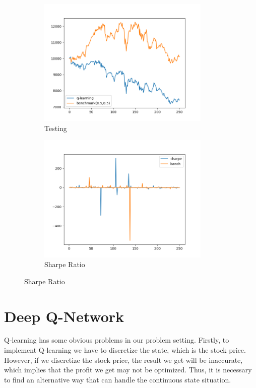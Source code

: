 \begin{figure}[H]
\begin{subfigure}{.5\textwidth}
\includegraphics[clip, width=0.9\textwidth]{Graphics/NEW_TEST_REWARDPV.png} \caption{Testing} 
\end{subfigure}%
\begin{subfigure}{.5\textwidth}%
\centering
\includegraphics[clip, width=0.9\textwidth]{Graphics/REWARDPVS.png} \caption{Sharpe Ratio}
\end{subfigure}%
\end{figure}

\section{Deep Q-Network}

Q-learning has some obvious problems in our problem setting.
Firstly, to implement Q-learning we have to discretize the state, which is the stock price. However, if we discretize the stock price, the result we get will be inaccurate, which implies that the profit we get may not be optimized. Thus, it is necessary to find an alternative way that can handle the continuous state situation.


